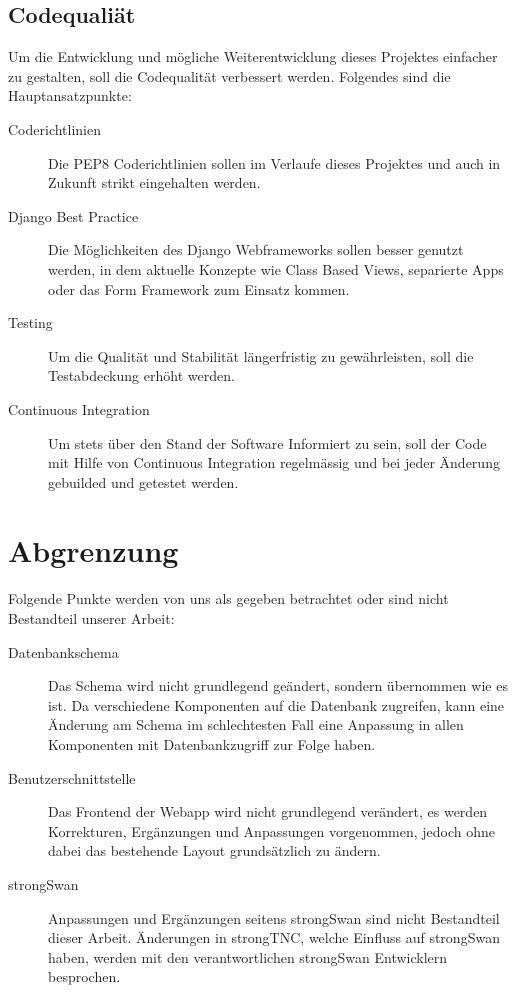 \subsection{Codequaliät}
Um die Entwicklung und mögliche Weiterentwicklung dieses Projektes einfacher zu
gestalten, soll die Codequalität verbessert werden. Folgendes sind die
Hauptansatzpunkte:
\begin{description}
	\item[Coderichtlinien] Die PEP8 Coderichtlinien sollen im Verlaufe dieses
	Projektes und auch in Zukunft strikt eingehalten werden.
	
	\item[Django Best Practice] Die Möglichkeiten des Django Webframeworks sollen
	besser genutzt werden, in dem aktuelle Konzepte wie Class Based Views,
	separierte Apps oder das Form Framework zum Einsatz kommen.
	
	\item[Testing] Um die Qualität und Stabilität längerfristig zu gewährleisten,
	soll die Testabdeckung erhöht werden.
	
	\item[Continuous Integration] Um stets über den Stand der Software Informiert
	zu sein, soll der Code mit Hilfe von Continuous Integration regelmässig und bei
	jeder Änderung gebuilded und getestet werden.
	
\end{description}


\section{Abgrenzung}
Folgende Punkte werden von uns als gegeben betrachtet oder sind nicht
Bestandteil unserer Arbeit:

\begin{description}
	\item[Datenbankschema] Das Schema wird nicht grundlegend geändert, sondern
	übernommen wie es ist. Da verschiedene Komponenten auf die Datenbank zugreifen,
	kann eine Änderung am Schema im schlechtesten Fall eine Anpassung in allen
	Komponenten mit Datenbankzugriff zur Folge haben.

	\item[Benutzerschnittstelle] Das Frontend der Webapp wird nicht grundlegend
	verändert, es werden Korrekturen, Ergänzungen und Anpassungen vorgenommen,
	jedoch ohne dabei das bestehende Layout grundsätzlich zu ändern.

	\item[strongSwan] Anpassungen und Ergänzungen seitens strongSwan sind nicht
	Bestandteil dieser Arbeit. Änderungen in strongTNC, welche Einfluss auf
	strongSwan haben, werden mit den verantwortlichen strongSwan Entwicklern
	besprochen.
\end{description}


